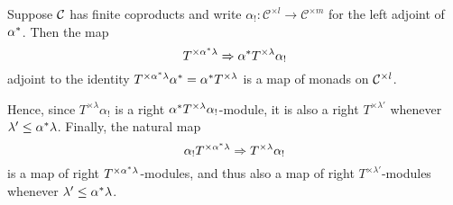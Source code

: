 \documentclass[a4paper,10pt]{article}%
\begin{document}
\begin{proposition}\label{MONADICFUN PROP}
	Suppose $\mathcal{C}$ has finite coproducts and write
	$\alpha_{!} \colon \mathcal{C}^{\times l} \to 
	\mathcal{C}^{\times m}$
	for the left adjoint of $\alpha^{\**}$. 
	Then the map
\begin{equation}\label{MONADFUNCTORALPHA EQ}
	T^{\times \alpha^{\**} \lambda} \Rightarrow \alpha^{\**} T^{\times \lambda} \alpha_{!}
\end{equation}
adjoint to the identity 
$T^{\times \alpha^{\**}\lambda} \alpha^{\**} =
\alpha^{\**} T^{\times \lambda}$
is a map of monads on $\mathcal{C}^{\times l}$.

Hence, since $T^{\times \lambda} \alpha_!$ is a right 
$\alpha^{\**} T^{\times \lambda}\alpha_{!}$-module, 
it is also a right $T^{\times \lambda'}$ whenever
$\lambda' \leq \alpha^{\**} \lambda$.
Finally, the natural map 
\begin{equation}\label{MONADFUNCTORALPHADOU EQ}
	\alpha_{!} T^{\times \alpha^{\**} \lambda} \Rightarrow  T^{\times \lambda} \alpha_{!}
\end{equation}
is a map of right $T^{\times \alpha^{\**} \lambda}$-modules, 
and thus also a map of right 
$T^{\times \lambda'}$-modules
whenever $\lambda' \leq \alpha^{\**} \lambda$.
\end{proposition}

\end{document}
